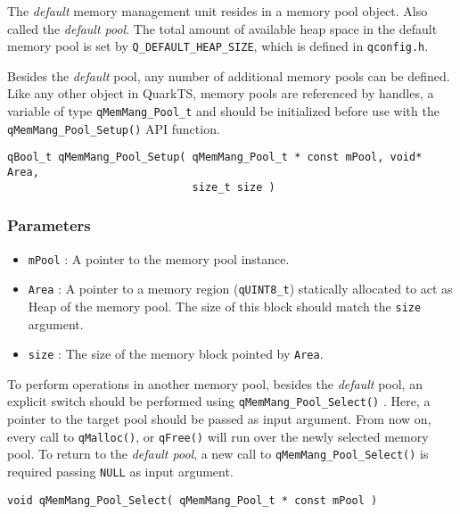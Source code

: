 The \textit{default} memory management unit resides in a memory pool object. Also called the \textit{default pool}. The total amount of available heap space in the default memory pool is set by \lstinline{Q_DEFAULT_HEAP_SIZE}, which is defined in \lstinline{qconfig.h}.

Besides the \textit{default} pool, any number of additional memory pools can be defined. Like any other object in QuarkTS, memory pools are referenced by handles, a variable of type \lstinline{qMemMang_Pool_t}  and should be initialized before use with the \lstinline{qMemMang_Pool_Setup()}  API function.
\medskip

\begin{lstlisting}[style=CStyle]
qBool_t qMemMang_Pool_Setup( qMemMang_Pool_t * const mPool, void* Area, 
                             size_t size )
\end{lstlisting}

\subsubsection*{Parameters}
\begin{itemize}
    \item \lstinline{mPool} : A pointer to the memory pool instance. 
    \item \lstinline{Area} :  A pointer to a memory region (\lstinline{qUINT8_t}) statically allocated to act as Heap of the memory pool. The size of this block should match the \lstinline{size} argument.
    \item \lstinline{size} : The size of the memory block pointed by \lstinline{Area}. 
\end{itemize}

To perform operations in another memory pool, besides the \textit{default} pool, an explicit switch should be performed using \lstinline{qMemMang_Pool_Select()} . Here, a pointer to the target pool should be passed as input argument.  From now on, every call to \lstinline{qMalloc()}, or \lstinline{qFree()} will run over the newly selected memory pool. To return to  the \textit{default pool},  a new call to  \lstinline{qMemMang_Pool_Select()} is required passing \lstinline{NULL} as input argument. 
\medskip

\begin{lstlisting}[style=CStyle]
void qMemMang_Pool_Select( qMemMang_Pool_t * const mPool )
\end{lstlisting}

